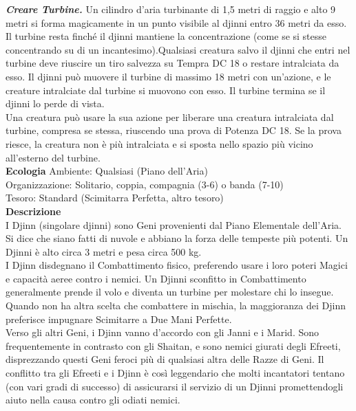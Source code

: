 \begin{multicols}{2}
\emph{\textbf{Creare Turbine.}} Un cilindro d'aria turbinante di 1,5 metri di raggio e alto 9 metri si forma magicamente in un punto visibile al djinni entro 36 metri da esso. Il turbine resta finché il djinni mantiene la concentrazione (come se si stesse concentrando su di un incantesimo).Qualsiasi creatura salvo il djinni che entri nel turbine  deve riuscire un tiro salvezza su Tempra DC 18 o restare intralciata da esso. Il djinni può muovere il turbine di massimo 18 metri con un'azione, e le creature intralciate dal turbine si muovono con esso. Il turbine termina se il djinni lo perde di vista.\\
Una creatura può usare la sua azione per liberare una creatura intralciata dal turbine, compresa se stessa, riuscendo una prova di Potenza DC 18. Se la prova riesce, la creatura non è più intralciata e si sposta nello spazio più vicino all'esterno del turbine.\\
\textbf{Ecologia}
Ambiente: Qualsiasi (Piano dell'Aria)\\
Organizzazione: Solitario, coppia, compagnia (3-6) o banda (7-10)\\
Tesoro: Standard (Scimitarra Perfetta, altro tesoro)\\
\textbf{Descrizione}\\
I Djinn (singolare djinni) sono Geni provenienti dal Piano Elementale dell’Aria. Si dice che siano fatti di nuvole e abbiano la forza delle tempeste più potenti. Un Djinni è alto circa 3 metri e pesa circa 500 kg.\\

I Djinn disdegnano il Combattimento fisico, preferendo usare i loro poteri Magici e capacità aeree contro i nemici. Un Djinni sconfitto in Combattimento generalmente prende il volo e diventa un turbine per molestare chi lo insegue. Quando non ha altra scelta che combattere in mischia, la maggioranza dei Djinn preferisce impugnare Scimitarre a Due Mani Perfette.\\

Verso gli altri Geni, i Djinn vanno d’accordo con gli Janni e i Marid. Sono frequentemente in contrasto con gli Shaitan, e sono nemici giurati degli Efreeti, disprezzando questi Geni feroci più di qualsiasi altra delle Razze di Geni. Il conflitto tra gli Efreeti e i Djinn è così leggendario che molti incantatori tentano (con vari gradi di successo) di assicurarsi il servizio di un Djinni promettendogli aiuto nella causa contro gli odiati nemici.\\


\end{multicols}
